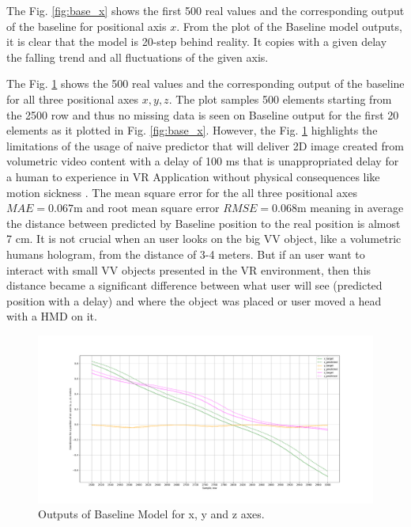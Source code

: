 The Fig. \ref{fig:base_x} shows the first 500 real values and the corresponding output of the baseline for positional axis $x$. From the plot of the Baseline model outputs, it is clear that the model is 20-step behind reality. It copies with a given delay the falling trend and all fluctuations of the given axis.

The Fig. \ref{fig:base_xyz} shows the 500 real values and the corresponding output of the baseline for all three positional axes $x, y, z$. The plot samples 500 elements starting from the 2500 row and thus no missing data is seen on Baseline output for the first 20 elements as it plotted in Fig. \ref{fig:base_x}. However, the Fig. \ref{fig:base_xyz} highlights the limitations of the usage of naive predictor that will deliver 2D image created from volumetric video content with a delay of 100 ms that is unappropriated delay for a human to experience in VR Application without physical consequences like motion sickness \cite{delay_sickness}. The mean square error for the all three positional axes $MAE = 0.067$m and root mean square error  $RMSE = 0.068$m meaning in average the distance between predicted by Baseline position to the real position is almost 7 cm. It is not crucial when an user looks on the big VV object, like a volumetric humans hologram, from the distance of 3-4 meters. But if an user want to interact with small VV objects presented in the VR environment, then this distance became a significant difference between what user will see (predicted position with a delay) and where the object was placed or user moved a head with a HMD on it. 

\begin{figure}[htb]
	\begin{center}
		\includegraphics[width=1\textwidth, keepaspectratio]{gfx/base_zoom-xyz_position.pdf}
		\caption{\label{fig:base_xyz} Outputs of Baseline Model for x, y and z axes.}
	\end{center}
\end{figure}

